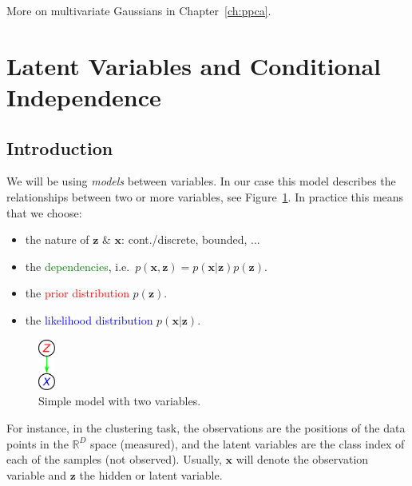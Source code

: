 More on multivariate Gaussians in Chapter~\ref{ch:ppca}.

\section{Latent Variables and Conditional Independence}
\subsection{Introduction}
We will be using \textit{models} between variables. In our case this model describes the relationships between two or more variables, see Figure~\ref{fig:simple-model}. In practice this means that we choose:
\begin{itemize}
    \item the nature of $\mathbf{z}$ \& $\mathbf{x}$: cont./discrete, bounded, ...
    \item the \textcolor{green}{dependencies}, i.e.\ $p(\mathbf{x},\mathbf{z})=p(\mathbf{x}|\mathbf{z})p(\mathbf{z})$.
    \item the \textcolor{red}{prior distribution} $p(\mathbf{z})$.
    \item the \textcolor{blue}{likelihood distribution} $p(\mathbf{x}|\mathbf{z})$.
\end{itemize}

\begin{figure}[H]
 \centering
 \includegraphics[width=0.05\textwidth]{fig/simple-model.pdf}
 \caption{Simple model with two variables.\label{fig:simple-model}}
\end{figure}


For instance, in the clustering task, the observations are the positions of the data points in the $\mathbb{R}^D$ space (measured), and the latent variables are the class index of each of the samples (not observed). Usually, $\mathbf{x}$ will denote the observation variable and $\mathbf{z}$ the hidden or latent variable.\vspace{2mm}
   
